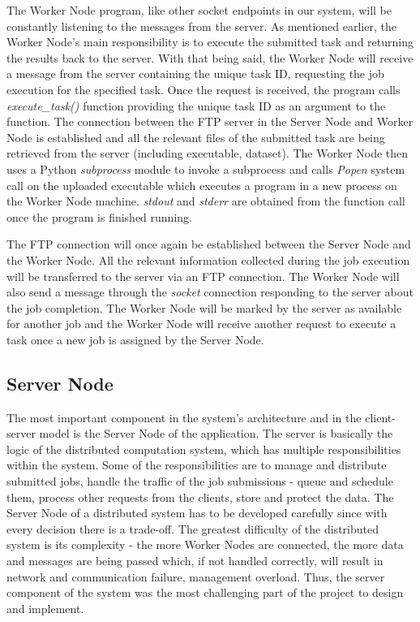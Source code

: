 \documentclass[10pt]{report}
\begin{document}
The Worker Node program, like other socket endpoints in our system, will be constantly listening to the messages from the server. As mentioned earlier, the Worker Node's main responsibility is to execute the submitted task and returning the results back to the server. With that being said, the Worker Node will receive a message from the server containing the unique task ID, requesting the job execution for the specified task. Once the request is received, the program calls \textit{execute\_task()} function providing the unique task ID as an argument to the function. The connection between the FTP server in the Server Node and Worker Node is established and all the relevant files of the submitted task are being retrieved from the server (including executable, dataset). The Worker Node then uses a Python \textit{subprocess} module to invoke a subprocess and calls \textit{Popen} system call on the uploaded executable which executes a program in a new process on the Worker Node machine. \textit{stdout} and \textit{stderr} are obtained from the function call once the program is finished running.
\newline

The FTP connection will once again be established between the Server Node and the Worker Node. All the relevant information collected during the job execution will be transferred to the server via an FTP connection. The Worker Node will also send a message through the \textit{socket} connection responding to the server about the job completion. The Worker Node will be marked by the server as available for another job and the Worker Node will receive another request to execute a task once a new job is assigned by the Server Node.

\subsection{Server Node}

The most important component in the system's architecture and in the client-server model is the Server Node of the application. The server is basically the logic of the distributed computation system, which has multiple responsibilities within the system. Some of the responsibilities are to manage and distribute submitted jobs, handle the traffic of the job submissions - queue and schedule them, process other requests from the clients, store and protect the data. The Server Node of a distributed system has to be developed carefully since with every decision there is a trade-off. The greatest difficulty of the distributed system is its complexity - the more Worker Nodes are connected, the more data and messages are being passed which, if not handled correctly, will result in network and communication failure, management overload. Thus, the server component of the system was the most challenging part of the project to design and implement.
\end{document}
